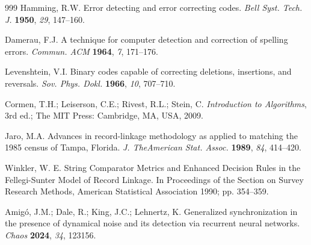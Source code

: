 \documentclass{article}
\begin{document}
\begin{thebibliography}{999}
 Hamming, R.W. Error detecting and error correcting
codes. \emph{ Bell Syst. Tech. J.} \textbf{1950}, \emph{29}, 147--160.

 Damerau, F.J. A technique for computer detection and
correction of spelling errors. \emph{Commun. ACM} \textbf{1964}, \emph{7}, 171--176.

 Levenshtein, V.I. Binary codes capable of
correcting deletions, insertions, and reversals. \emph{Sov. Phys. Dokl.} \textbf{1966}, \emph{10}, 707--710.  

 Cormen, T.H.; Leiserson, C.E.; Rivest, R.L.; Stein, C.
\emph{Introduction to Algorithms}, 3rd ed.; The MIT Press: Cambridge, MA, USA, 2009.

 Jaro, M.A. Advances in record-linkage methodology as
applied to matching the 1985 census of Tampa, Florida. \emph{J. TheAmerican Stat. Assoc.} \textbf{1989}, \emph{84}, 414--420.

 Winkler, W. E. String Comparator Metrics and Enhanced
Decision Rules in the Fellegi-Sunter Model of Record Linkage. In Proceedings of
the Section on Survey Research Methods, American Statistical Association 1990; pp. 
354--359.

 Amig\'{o}, J.M.; Dale, R.; King, J.C.; Lehnertz, K.
Generalized synchronization in the presence of dynamical noise and its
detection via recurrent neural networks. \emph{Chaos} \textbf{2024}, \emph{34}, 123156.


\end{thebibliography}
\end{document}
